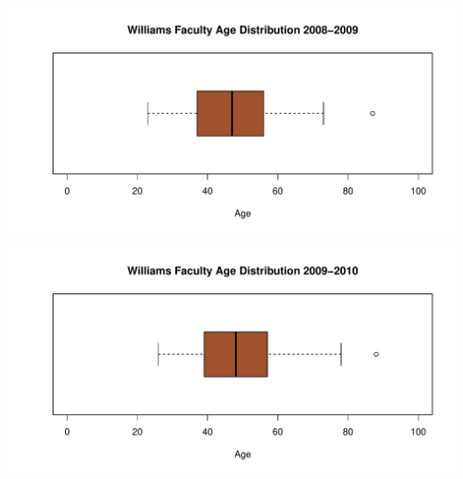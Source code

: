 \documentclass[12pt,a4paper]{article}\usepackage[]{graphicx}\usepackage[]{color}
\makeatletter
\def\maxwidth{ %
  \ifdim\Gin@nat@width>\linewidth
    \linewidth
  \else
    \Gin@nat@width
  \fi
}
\newenvironment{knitrout}{}{} %
\theoremstyle{definition}
\makeatother
\begin{document}
\begin{knitrout}
\color{fgcolor}
\includegraphics[width=\maxwidth]{figure/unnamed-chunk-23-1} 

\end{knitrout}

\begin{knitrout}
\color{fgcolor}
\includegraphics[width=\maxwidth]{figure/unnamed-chunk-24-1} 

\end{knitrout}
\end{document}
